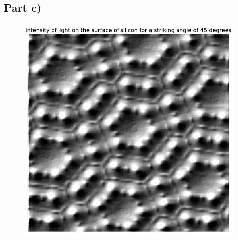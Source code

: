 \documentclass[a4paper,12pt]{article}
\begin{document}
\subsection{Part c)}

\begin{figure}[H]
\centering
\includegraphics[width = \linewidth]{lab3q4c.png}
\caption{}
\label{fig:q4c}
\end{figure}
\end{document}
